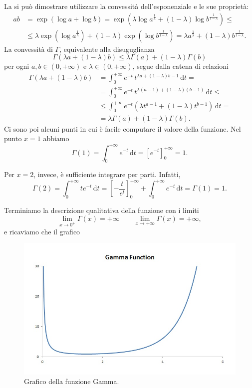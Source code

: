 La si può dimostrare utilizzare la convessità dell'esponenziale e le sue proprietà:
\[
\begin{split}
	ab &= \exp\left(\log a + \log b\right) = \exp\left({\lambda \log a^\frac{1}{\lambda} + \left(1-\lambda\right) \log b^\frac{1}{1-\lambda}}\right) \leq\\
	&\leq \lambda \exp\left(\log a^\frac{1}{\lambda}\right) + \left(1-\lambda\right)\exp\left(\log b^\frac{1}{1-\lambda}\right) = \lambda a^\frac{1}{\lambda} + \left(1-\lambda\right) b^\frac{1}{1-\lambda}.
\end{split}
\]
La convessità di $\Gamma$, equivalente alla disuguglianza
\[
	\Gamma(\lambda a + (1-\lambda) b) \leq \lambda\Gamma(a) + (1-\lambda)\Gamma(b)
\]
per ogni $a,b \in \left(0,+\infty\right)$ e $\lambda\in\left(0,+\infty\right)$, segue dalla catena di relazioni
\[
\begin{split}
	\Gamma(\lambda a + (1-\lambda) b) 
	&= \int_{0}^{+\infty}e^{-t}\,t^{\lambda a + (1-\lambda) b -1}\,\mathrm{d}t = \\	
	&= \int_{0}^{+\infty}e^{-t}\,t^{\lambda (a-1) + (1-\lambda) (b-1)}\,\mathrm{d}t \leq \\
	&\leq \int_{0}^{+\infty}e^{-t}\left(\lambda t^{a-1} + (1-\lambda) t^{b-1}\right)\,\mathrm{d}t = \\	
	&= \lambda\Gamma(a) + (1-\lambda)\Gamma(b).
\end{split}
\]
Ci sono poi alcuni punti in cui è facile computare il valore della funzione.
Nel punto $x=1$ abbiamo 
\[
	\Gamma(1)=\int_{0}^{+\infty}e^{-t}\,\mathrm{d}t=\left[ e^{-t}\right]_0^{+\infty}=1.
\]

Per $x=2$, invece, è sufficiente integrare per parti. Infatti, 
\[
	\Gamma(2)=
	\int_{0}^{+\infty} te^{-t} \,\mathrm{d}t=
	\left[ -\frac{t}{e^t} \right]_0^{+\infty} 
	+ \int_{0}^{+\infty} e^{-t} \,\mathrm{d}t =
	\Gamma(1) =
	1.
\]

Terminiamo la descrizione qualitativa della funzione con i limiti
\[
	\lim\limits_{x\to0^+}\Gamma(x)=+\infty\qquad\lim\limits_{x\to+\infty}\Gamma(x)=+\infty,
\]
e ricaviamo che il grafico
\begin{figure}
	\centering
	\includegraphics[width=.7\textwidth]{gamma_graph.jpg}
	\caption{Grafico della funzione Gamma.}
\end{figure}

